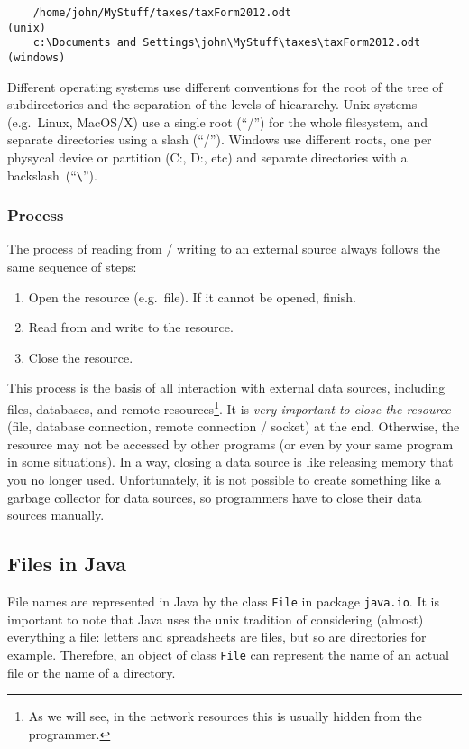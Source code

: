 \begin{verbatim}
    /home/john/MyStuff/taxes/taxForm2012.odt                     (unix)
    c:\Documents and Settings\john\MyStuff\taxes\taxForm2012.odt (windows)
\end{verbatim}

Different operating systems use different conventions for the root of
the tree of subdirectories and the separation of the levels of
hieararchy. Unix systems (e.g.~Linux, MacOS/X) use a single root
(``/'') for the whole filesystem, and separate directories using a
slash (``/''). Windows use different roots, one per physycal device or
partition (C:, D:, etc) and separate directories with a 
backslash~(``\verb+\+''). 



\subsubsection*{Process}
\label{sec:process}

The process of reading from / writing to an external source always
follows the same sequence of steps:

\begin{enumerate}
\item Open the resource (e.g.~file). If it cannot be opened, finish.
\item Read from and write to the resource.
\item Close the resource. 
\end{enumerate}

This process is the basis of all interaction with external data
sources, including files, databases, and remote resources\footnote{As
  we will see, in the network resources this is usually hidden from
  the programmer.}.
It is \emph{very important to close the resource} (file, database
connection, remote connection / socket) at the
end. Otherwise, the resource may not be accessed by other programs (or
even by your same program in some situations). In a way, closing a
data source is like releasing memory that you no longer
used. Unfortunately, it is not possible to create something like a
garbage collector for data sources, so programmers have to close their
data sources manually.

\subsection{Files in Java}
\label{sec:files-java}

File names are represented in Java by the class \verb+File+ in package
\verb+java.io+. It is important to note that Java uses the unix
tradition of considering (almost) everything a file: letters and
spreadsheets are files, but so are directories for example. Therefore,
an object of class \verb+File+ can represent the name of an actual
file or the name of a directory.

